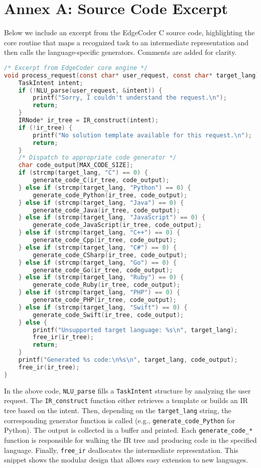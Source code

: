 \documentclass[12pt]{article}
\begin{document}
\clearpage
\section*{Annex A: Source Code Excerpt}
\noindent 
Below we include an excerpt from the EdgeCoder C source code, highlighting the core routine that maps a recognized task to an intermediate representation and then calls the language-specific generators. Comments are added for clarity.

{\singlespacing
\begin{lstlisting}[language=C]
/* Excerpt from EdgeCoder core engine */
void process_request(const char* user_request, const char* target_lang) {
    TaskIntent intent;
    if (!NLU_parse(user_request, &intent)) {
        printf("Sorry, I couldn't understand the request.\n");
        return;
    }
    IRNode* ir_tree = IR_construct(intent);
    if (!ir_tree) {
        printf("No solution template available for this request.\n");
        return;
    }
    /* Dispatch to appropriate code generator */
    char code_output[MAX_CODE_SIZE];
    if (strcmp(target_lang, "C") == 0) {
        generate_code_C(ir_tree, code_output);
    } else if (strcmp(target_lang, "Python") == 0) {
        generate_code_Python(ir_tree, code_output);
    } else if (strcmp(target_lang, "Java") == 0) {
        generate_code_Java(ir_tree, code_output);
    } else if (strcmp(target_lang, "JavaScript") == 0) {
        generate_code_JavaScript(ir_tree, code_output);
    } else if (strcmp(target_lang, "C++") == 0) {
        generate_code_Cpp(ir_tree, code_output);
    } else if (strcmp(target_lang, "C#") == 0) {
        generate_code_CSharp(ir_tree, code_output);
    } else if (strcmp(target_lang, "Go") == 0) {
        generate_code_Go(ir_tree, code_output);
    } else if (strcmp(target_lang, "Ruby") == 0) {
        generate_code_Ruby(ir_tree, code_output);
    } else if (strcmp(target_lang, "PHP") == 0) {
        generate_code_PHP(ir_tree, code_output);
    } else if (strcmp(target_lang, "Swift") == 0) {
        generate_code_Swift(ir_tree, code_output);
    } else {
        printf("Unsupported target language: %s\n", target_lang);
        free_ir(ir_tree);
        return;
    }
    printf("Generated %s code:\n%s\n", target_lang, code_output);
    free_ir(ir_tree);
}
\end{lstlisting}
}

\noindent In the above code, \texttt{NLU\_parse} fills a \texttt{TaskIntent} structure by analyzing the user request. The \texttt{IR\_construct} function either retrieves a template or builds an IR tree based on the intent. Then, depending on the \texttt{target\_lang} string, the corresponding generator function is called (e.g., \texttt{generate\_code\_Python} for Python). The output is collected in a buffer and printed. Each \texttt{generate\_code\_*} function is responsible for walking the IR tree and producing code in the specified language. Finally, \texttt{free\_ir} deallocates the intermediate representation. This snippet shows the modular design that allows easy extension to new languages.
\end{document}
